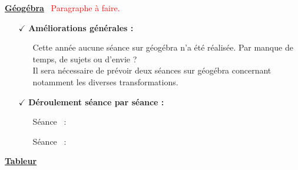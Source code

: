 \documentclass[12pt,a4paper]{article} %
\newcounter{num}
\newcommand{\seance}{\stepcounter{num} Séance \thenum \, : \\}
\newcounter{fiche}
\begin{document}
\vspace{36pt}
\begin{Large}
\textbf{\underline{Géogébra}} \, \textcolor{red}{Paragraphe à faire.}
\end{Large} \vspace{6pt}
\begin{itemize}
\item[$\checkmark$]
\textbf{Améliorations générales :}
\begin{itemize}
\item[\textbullet]
Cette année aucune séance sur géogébra n'a été réalisée. Par manque de temps, de sujets ou d'envie ? \\
Il sera nécessaire de prévoir deux séances sur géogébra concernant notamment les diverses transformations.
\item[\textbullet]

\end{itemize}
\setcounter{num}{0}
\setcounter{fiche}{0}
\item[$\checkmark$]
\textbf{Déroulement séance par séance :}
\begin{itemize}
\item[\textbullet]
\seance

\item[\textbullet]
\seance

\end{itemize}
\end{itemize}
\vspace{36pt}
\newpage
\begin{Large}
\textbf{\underline{Tableur}}
\end{Large} \vspace{6pt}
\end{document}
